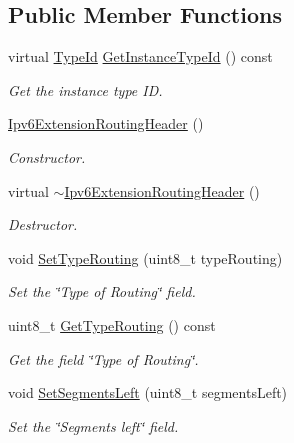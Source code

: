 \subsection*{Public Member Functions}
\begin{DoxyCompactItemize}
\item 
virtual \hyperlink{classns3_1_1TypeId}{Type\+Id} \hyperlink{classns3_1_1Ipv6ExtensionRoutingHeader_aee7a1bca33ca281ddd71cb39a31cb4e2}{Get\+Instance\+Type\+Id} () const 
\begin{DoxyCompactList}\small\item\em Get the instance type ID. \end{DoxyCompactList}\item 
\hyperlink{classns3_1_1Ipv6ExtensionRoutingHeader_ad7d3f362c52c46478a73820c8130489a}{Ipv6\+Extension\+Routing\+Header} ()
\begin{DoxyCompactList}\small\item\em Constructor. \end{DoxyCompactList}\item 
virtual \hyperlink{classns3_1_1Ipv6ExtensionRoutingHeader_a19b4ec3e8e8a5bd29ec12cb62431a1fd}{$\sim$\+Ipv6\+Extension\+Routing\+Header} ()
\begin{DoxyCompactList}\small\item\em Destructor. \end{DoxyCompactList}\item 
void \hyperlink{classns3_1_1Ipv6ExtensionRoutingHeader_a227281f25a92273d206b284fea5ef410}{Set\+Type\+Routing} (uint8\+\_\+t type\+Routing)
\begin{DoxyCompactList}\small\item\em Set the \char`\"{}\+Type of Routing\char`\"{} field. \end{DoxyCompactList}\item 
uint8\+\_\+t \hyperlink{classns3_1_1Ipv6ExtensionRoutingHeader_a7c190891c64805a1df57c920a257bab7}{Get\+Type\+Routing} () const 
\begin{DoxyCompactList}\small\item\em Get the field \char`\"{}\+Type of Routing\char`\"{}. \end{DoxyCompactList}\item 
void \hyperlink{classns3_1_1Ipv6ExtensionRoutingHeader_ac5b62f0810ca16780c26d00f4da4b83f}{Set\+Segments\+Left} (uint8\+\_\+t segments\+Left)
\begin{DoxyCompactList}\small\item\em Set the \char`\"{}\+Segments left\char`\"{} field. \end{DoxyCompactList}\item 

\end{DoxyCompactItemize}

